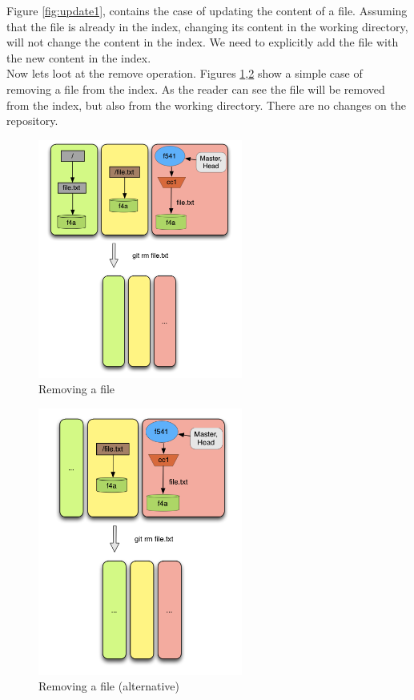 Figure \ref{fig:update1}, contains the case of updating the content of a file.
Assuming that the file is already in the index, changing its content in the 
working directory, will not change the content in the index. We need to 
explicitly add the file with the new content in the index. \\ 

Now lets loot at the remove operation. Figures \ref{fig:remove1},\ref{fig:remove2} 
show a simple case of
removing a file from the index. As the reader can see the file will be
removed from the index, but also from the working directory. 
There are no changes on the repository.


\begin{figure}[tp]
   \centering
   \includegraphics[width=0.6\textwidth]{images/remove1.png}
   \caption{Removing a file}\label{fig:remove1}
\end{figure}

\begin{figure}[tp]
   \centering
   \includegraphics[width=0.6\textwidth]{images/remove2.png}
   \caption{Removing a file (alternative)}\label{fig:remove2}
\end{figure}



